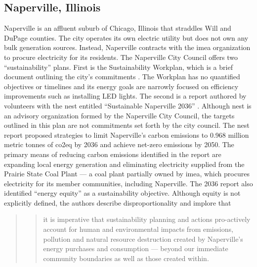 \subsection{Naperville, Illinois}
Naperville is an affluent suburb of Chicago, Illinois that straddles Will and
DuPage counties. The city operates its own electric utility but does not own any
bulk generation sources. Instead, Naperville contracts with the \ac{imea}
organization to procure electricity for its residents. The Naperville City
Council offers two ``sustainability'' plans. First is the Sustainability
Workplan, which is a brief document outlining the city's commitments
\cite{mjolness_city_2025}. The Workplan has no quantified objectives or
timelines and its energy goals are narrowly focused on efficiency improvements such as
installing LED lights. The second is a report authored by volunteers with the
\acf{nest} entitled ``Sustainable Naperville 2036''
\cite{trendler_sustainable_2021}. Although \ac{nest} is an advisory organization
formed by the Naperville City Council, the targets outlined in this plan are not
commitments set forth by the city council. The \ac{nest} report proposed
strategies to limit Naperville's carbon emissions to 0.968 million metric tonnes
of \ac{co2eq} by 2036 and achieve net-zero emissions by 2050. The primary
means of reducing carbon emissions identified in the report are expanding local
energy generation and eliminating electricity supplied from the Prairie State
Coal Plant --- a coal plant partially owned by \ac{imea}, which procures
electricity for its member communities, including Naperville. The 2036 report
also identified ``energy equity'' as a sustainability objective. Although equity
is not explicitly defined, the authors describe disproportionality and implore
that
\begin{quote}
    \blockcquote[11]{trendler_sustainable_2021}{it is imperative that
    sustainability planning and actions pro-actively account for human and
    environmental  
    impacts from emissions, pollution and natural resource destruction created
    by Naperville's energy purchases and  consumption --- beyond our immediate
    community boundaries as well as those created within.}
\end{quote}
